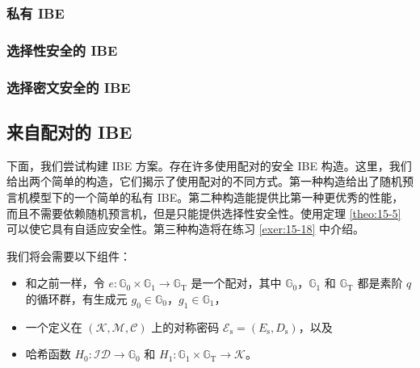 \subsubsection{私有 IBE}\label{subsubsec:15-6-2-1}

\begin{game}[私有 IBE]\label{game:15-5}
	
\end{game}

\begin{definition}[私有 IBE]\label{def:15-9}
	
\end{definition}

\subsubsection{选择性安全的 IBE}\label{subsubsec:15-6-2-2}

\begin{game}[选择性语义安全性]\label{game:15-6}
	
\end{game}

\begin{definition}[选择性安全性]\label{def:15-10}
	
\end{definition}

\begin{theorem}\label{theo:15-5}
	
\end{theorem}

\subsubsection{选择密文安全的 IBE}\label{subsubsec:15-6-2-3}

\subsection{来自配对的 IBE}\label{subsec:15-6-3}

下面，我们尝试构建 IBE 方案。存在许多使用配对的安全 IBE 构造。这里，我们给出两个简单的构造，它们揭示了使用配对的不同方式。第一种构造给出了随机预言机模型下的一个简单的私有 IBE。第二种构造能提供比第一种更优秀的性能，而且不需要依赖随机预言机，但是只能提供选择性安全性。使用定理 \ref{theo:15-5} 可以使它具有自适应安全性。第三种构造将在练习 \ref{exer:15-18} 中介绍。

我们将会需要以下组件：
\begin{itemize}
	\item 和之前一样，令 $e:\mathbb{G}_0\times\mathbb{G}_1\to\mathbb{G}_\mathrm{T}$ 是一个配对，其中 $\mathbb{G}_0$，$\mathbb{G}_1$ 和 $\mathbb{G}_\mathrm{T}$ 都是素阶 $q$ 的循环群，有生成元 $g_0\in\mathbb{G}_0$，$g_1\in\mathbb{G}_1$，
	\item 一个定义在 $(\mathcal{K},\mathcal{M},\mathcal{C})$ 上的对称密码 $\mathcal{E}_\mathrm{s}=(E_\mathrm{s},D_\mathrm{s})$，以及
	\item 哈希函数 $H_0:\mathcal{ID}\to\mathbb{G}_0$ 和 $H_1:\mathbb{G}_1\times\mathbb{G}_\mathrm{T}\to\mathcal{K}$。
\end{itemize}

